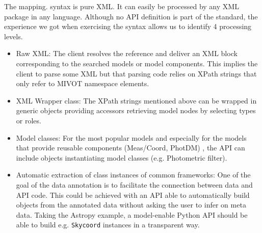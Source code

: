 The mapping. syntax is pure XML. It can easily be processed by any XML package in any language.
Although no API definition is part of the standard, the experience we got when exercising the syntax allows us to identify 
4 processing levels.


\begin{itemize} 
  \item Raw XML: The client resolves the reference and deliver an XML block corresponding to the searched models or model components. 
          This implies the client to parse some XML but that parsing code relies on XPath strings that only refer to MIVOT namespace elements.
  \item XML Wrapper class: The XPath strings mentioned above can be wrapped in generic objects providing accessors retrieving model nodes by selecting types or roles. 
  \item Model classes: For the most popular models and especially for the models that provide reusable components (Meas/Coord, PhotDM) , the API can include objects instantiating model classes (e.g. Photometric filter).
  \item Automatic extraction of class instances of common frameworks: One of the goal of the data annotation is to facilitate the connection between data and API code. This could be achieved with an API able to automatically build objects from the annotated data without asking the user to infer on meta data. Taking the Astropy example, a model-enable Python API should be able to build e.g. \texttt{Skycoord} instances in a transparent way.
 \end{itemize}

